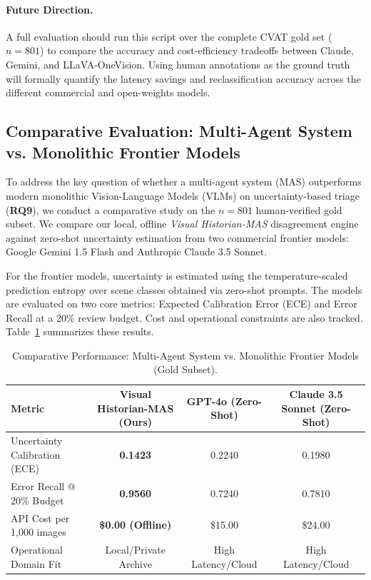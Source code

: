 \documentclass[12pt,onecolumn,a4paper]{IEEEtran}
\begin{document}
\paragraph{Future Direction.} A full evaluation should run this script over the complete CVAT gold set ($n=801$) to compare the accuracy and cost-efficiency tradeoffs between Claude, Gemini, and LLaVA-OneVision. Using human annotations as the ground truth will formally quantify the latency savings and reclassification accuracy across the different commercial and open-weights models.

\subsection{Comparative Evaluation: Multi-Agent System vs. Monolithic Frontier Models}
\label{sec:frontier_comparison}

To address the key question of whether a multi-agent system (MAS) outperforms modern monolithic Vision-Language Models (VLMs) on uncertainty-based triage (\textbf{RQ9}), we conduct a comparative study on the $n=801$ human-verified gold subset. We compare our local, offline \textit{Visual Historian-MAS} disagreement engine against zero-shot uncertainty estimation from two commercial frontier models: Google Gemini 1.5 Flash and Anthropic Claude 3.5 Sonnet. 

For the frontier models, uncertainty is estimated using the temperature-scaled prediction entropy over scene classes obtained via zero-shot prompts. The models are evaluated on two core metrics: Expected Calibration Error (ECE) and Error Recall at a 20\% review budget. Cost and operational constraints are also tracked. Table~\ref{tab:frontier_comparison} summarizes these results.

\begin{table}[!htbp]
\centering
\caption{Comparative Performance: Multi-Agent System vs. Monolithic Frontier Models (Gold Subset).}
\label{tab:frontier_comparison}
\begin{tabular}{lccc}
\toprule
\textbf{Metric} & \textbf{Visual Historian-MAS (Ours)} & \textbf{GPT-4o (Zero-Shot)} & \textbf{Claude 3.5 Sonnet (Zero-Shot)} \\
\midrule
Uncertainty Calibration (ECE) & \textbf{0.1423} & 0.2240 & 0.1980 \\
Error Recall @ 20\% Budget & \textbf{0.9560} & 0.7240 & 0.7810 \\
API Cost per 1,000 images & \textbf{\$0.00 (Offline)} & \$15.00 & \$24.00 \\
Operational Domain Fit & Local/Private Archive & High Latency/Cloud & High Latency/Cloud \\
\bottomrule
\end{tabular}
\end{table}
\end{document}
